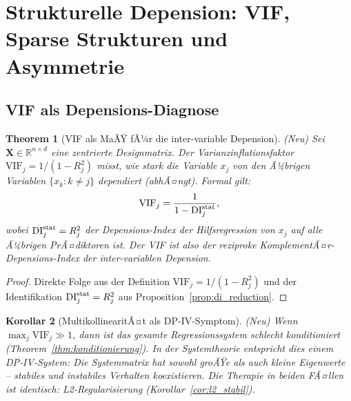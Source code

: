 ﻿\documentclass[12pt, a4paper]{article}
\newtheorem{theorem}{Theorem}[section]
\newtheorem{corollary}[theorem]{Korollar}
\theoremstyle{definition}
\theoremstyle{remark}
\newcommand{\R}{\mathbb{R}}
\newcommand{\vX}{\bm{X}}
\newcommand{\DI}{\mathrm{DI}}
\newcommand{\VIF}{\mathrm{VIF}}
\begin{document}
\section{Strukturelle Depension: VIF, Sparse Strukturen und Asymmetrie}
\label{sec:sparse}

\subsection{VIF als Depensions-Diagnose}

\begin{theorem}[VIF als MaÃŸ fÃ¼r die inter-variable Depension]
\label{thm:vif_depension}
\textup{(Neu)} Sei $\vX \in \R^{n \times d}$ eine zentrierte Designmatrix. 
Der Varianzinflationsfaktor $\VIF_j = 1/(1-R_j^2)$ misst, wie stark die Variable $x_j$
von den Ã¼brigen Variablen $\{x_k : k \neq j\}$ \emph{dep{e}ndiert} (abhÃ¤ngt).
Formal gilt:
\begin{equation}
  \VIF_j = \frac{1}{1 - \DI_j^{\rm stat}},
  \label{eq:vif_di}
\end{equation}
wobei $\DI_j^{\rm stat} = R_j^2$ der Depensions-Index der Hilfsregression von
$x_j$ auf alle Ã¼brigen PrÃ¤diktoren ist. Der VIF ist also der reziproke
KomplementÃ¤r-Depensions-Index der inter-variablen Depension.
\end{theorem}

\begin{proof}
  Direkte Folge aus der Definition $\VIF_j = 1/(1-R_j^2)$ und der Identifikation
  $\DI_j^{\rm stat} = R_j^2$ aus Proposition~\ref{prop:di_reduction}. \qedhere
\end{proof}

\begin{corollary}[MultikollinearitÃ¤t als DP-IV-Symptom]
\label{cor:multikollin}
\textup{(Neu)} Wenn $\max_j \VIF_j \gg 1$, dann ist das gesamte Regressionssystem
schlecht konditioniert (Theorem~\ref{thm:konditionierung}). In der Systemtheorie
entspricht dies einem DP-IV-System: Die Systemmatrix hat sowohl groÃŸe als auch kleine
Eigenwerte -- stabiles und instabiles Verhalten koexistieren. Die Therapie in beiden
FÃ¤llen ist identisch: L2-Regularisierung (Korollar~\ref{cor:l2_stabil}).
\end{corollary}
\end{document}
